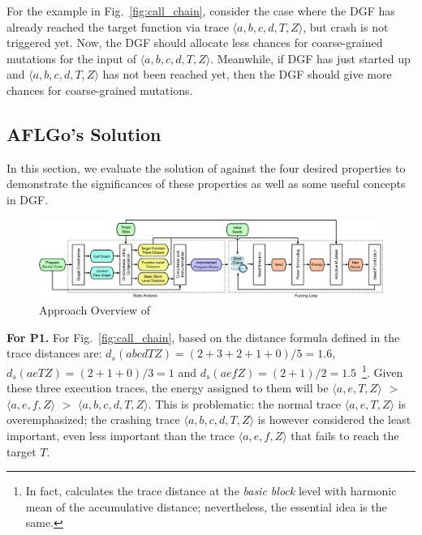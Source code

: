 For the example in Fig.~\ref{fig:call_chain}, consider the case where the DGF has already reached the target function via trace $\langle a, b, c, d, T, Z\rangle $, but crash is not triggered yet.
Now, the DGF should allocate less chances for coarse-grained mutations for the input of $\langle a, b, c, d, T, Z\rangle $.
Meanwhile, if DGF has just started up and $\langle a, b, c, d, T, Z\rangle $ has not been reached yet, then the DGF should give more chances for coarse-grained mutations.



\subsection{AFLGo's Solution} \label{subsec:aflgo_sol}


In this section, we evaluate the solution of \aflgo against the four desired properties to demonstrate the significances of these properties as well as some useful concepts in DGF.





\begin{figure}[ht]
	\includegraphics[width=.99\columnwidth]{res/dfot/overview.pdf}
	\caption{Approach Overview of \dFOT}
	\label{fig:overview}
\end{figure}

\textbf{For P1.} 
For Fig.~\ref{fig:call_chain}, based on the distance formula defined in \aflgo
the trace distances are:  $d_s(abcdTZ)=(2+3+2+1+0)/5=1.6$, $d_s(aeTZ)=(2+1+0)/3=1$ and $d_s(aefZ)=(2+1)/2=1.5$~\footnote{In fact, \aflgo calculates the trace distance at the \emph{basic block} level with harmonic mean of the accumulative distance; nevertheless, the essential idea is the same.}. 
Given these three execution traces, the energy assigned to them will be $ \langle a, e, T, Z\rangle$ $>$ $\langle a, e, f , Z\rangle$ $>$ $\langle a, b, c, d, T, Z\rangle$.
This is problematic: the normal trace $\langle a, e, T, Z\rangle $ is overemphasized; the crashing trace $\langle a, b, c, d, T, Z\rangle$ is however considered the least important, even less important than the trace $\langle a, e, f , Z\rangle$ that fails to reach the target $T$.



